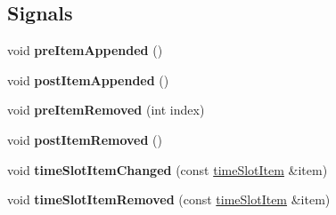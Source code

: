 \subsection*{Signals}
\begin{DoxyCompactItemize}
\item 
\mbox{\label{classtime_slot_list_a10230e14b11a55c793dd50787bf3d300}} 
void {\bfseries pre\+Item\+Appended} ()
\item 
\mbox{\label{classtime_slot_list_a6fb04319700b8efb24d173ee58b07945}} 
void {\bfseries post\+Item\+Appended} ()
\item 
\mbox{\label{classtime_slot_list_a7083a0f925da9af04d17e11fdc35ea47}} 
void {\bfseries pre\+Item\+Removed} (int index)
\item 
\mbox{\label{classtime_slot_list_a220054e6bd363e699cd7ca2209d861ba}} 
void {\bfseries post\+Item\+Removed} ()
\item 
\mbox{\label{classtime_slot_list_ab929a81211c334bd61600741b0d99ffa}} 
void {\bfseries time\+Slot\+Item\+Changed} (const \mbox{\hyperlink{structtime_slot_item}{time\+Slot\+Item}} \&item)
\item 
\mbox{\label{classtime_slot_list_a5ec2f91f9a292545664d3d4b97e21770}} 
void {\bfseries time\+Slot\+Item\+Removed} (const \mbox{\hyperlink{structtime_slot_item}{time\+Slot\+Item}} \&item)
\end{DoxyCompactItemize}
